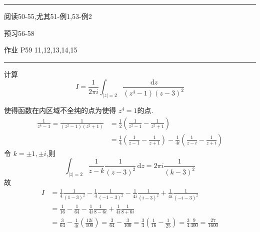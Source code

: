 \documentclass[../../复变函数.tex]{subfiles}
\begin{document}
\hspace*{\fill} 
\hrule
\hspace*{\fill}

阅读50-55,尤其51-例1,53-例2

预习56-58

作业 P59 11,12,13,14,15


\hspace*{\fill} 
\hrule
\hspace*{\fill}


\begin{example}
    计算 \[
     I =  \frac{1 }{2\pi i }\int_{\left| z \right|= 2 }\frac{\,\mathrm{d} z }{\left( z^{4}-1 \right)\left( z-3 \right)^{2}   }  
     \]
\end{example}
\begin{solution}
    使得函数在内区域不全纯的点为使得 \(  z^{4}= 1  \)的点.\[
    \begin{aligned}
    \frac{1 }{z^{4}-1 }= \frac{1 }{\left( z^{2}-1 \right)\left( z^{2}+ 1 \right)   }&=  \frac{1}{2}\left( \frac{1 }{z^{2}-1 }-\frac{1 }{z^{2}+ 1 }   \right)\\ 
     & =  \frac{1}{4}\left( \frac{1}{z-1}-\frac{1 }{z+ 1 }  \right)- \frac{1}{4i}\left( \frac{1}{z-i}-\frac{1}{z+i} \right)  
    \end{aligned}   
    \]令 \(  k= \pm 1,\pm i  \),则 \[
    \int_{\left| z \right|= 2 } \frac{1 }{z-k } \frac{1 }{\left( z-3 \right)^{2}  }\,\mathrm{d} z=2\pi i \frac{1}{\left( k-3 \right)^{2} }  
    \] 故 \[
 \begin{aligned}
    I &=  \frac{1}{4} \frac{1 }{\left( 1-3 \right)^{2}  }-\frac{1}{4}\frac{1 }{\left( -1-3 \right)^{2}  }- \frac{1}{4i} \frac{1 }{\left( i-3 \right)^{2}  }+ \frac{1}{4i}\frac{1 }{\left( -i-3 \right)^{2}  }    \\ 
     & =  \frac{1}{16}- \frac{1}{64}- \frac{1}{4i} \frac{1}{8-6i}+ \frac{1}{4i}\frac{1 }{8+ 6i } \\ 
      & = \frac{3}{64}- \frac{1}{4i}\left( \frac{12i }{ 100}  \right) = \frac{3}{64}- \frac{3 }{100 }= \frac{3}{4}\left( \frac{1}{16}-\frac{1}{25} \right)= \frac{3}{4} \frac{9 }{400 }= \frac{27 }{1600 }    
 \end{aligned}
    \]
\end{solution}

\hspace*{\fill} 

\hspace*{\fill} 
\end{document}
